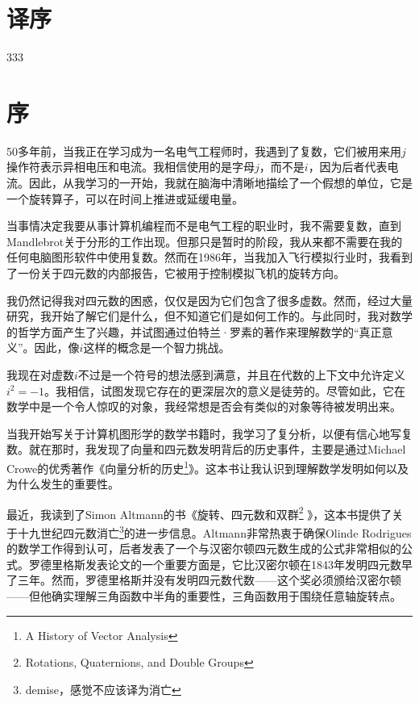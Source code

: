 \section*{译序} 
333

\newpage
{}
\section*{序}


50多年前，当我正在学习成为一名电气工程师时，我遇到了复数，它们被用来用$j$操作符表示异相电压和电流。我相信使用的是字母$j$，而不是$ i $，因为后者代表电流。因此，从我学习的一开始，我就在脑海中清晰地描绘了一个假想的单位，它是一个旋转算子，可以在时间上推进或延缓电量。


当事情决定我要从事计算机编程而不是电气工程的职业时，我不需要复数，直到Mandlebrot关于分形的工作出现。但那只是暂时的阶段，我从来都不需要在我的任何电脑图形软件中使用复数。然而在1986年，当我加入飞行模拟行业时，我看到了一份关于四元数的内部报告，它被用于控制模拟飞机的旋转方向。

我仍然记得我对四元数的困惑，仅仅是因为它们包含了很多虚数。然而，经过大量研究，我开始了解它们是什么，但不知道它们是如何工作的。与此同时，我对数学的哲学方面产生了兴趣，并试图通过伯特兰·罗素的著作来理解数学的“真正意义”。因此，像$i$这样的概念是一个智力挑战。

我现在对虚数$ i $不过是一个符号的想法感到满意，并且在代数的上下文中允许定义$ i ^{2}=-1$。我相信，试图发现它存在的更深层次的意义是徒劳的。尽管如此，它在数学中是一个令人惊叹的对象，我经常想是否会有类似的对象等待被发明出来。

当我开始写关于计算机图形学的数学书籍时，我学习了复分析，以便有信心地写复数。就在那时，我发现了向量和四元数发明背后的历史事件，主要是通过Michael Crowe的优秀著作《向量分析的历史\footnote{ A History of Vector Analysis}》。这本书让我认识到理解数学发明如何以及为什么发生的重要性。


最近，我读到了Simon Altmann的书《旋转、四元数和双群\footnote{Rotations, Quaternions, and Double Groups} 》，这本书提供了关于十九世纪四元数消亡\footnote{demise，感觉不应该译为消亡}的进一步信息。Altmann非常热衷于确保Olinde Rodrigues的数学工作得到认可，后者发表了一个与汉密尔顿四元数生成的公式非常相似的公式。罗德里格斯发表论文的一个重要方面是，它比汉密尔顿在1843年发明四元数早了三年。然而，罗德里格斯并没有发明四元数代数——这个奖必须颁给汉密尔顿——但他确实理解三角函数中半角的重要性，三角函数用于围绕任意轴旋转点。


